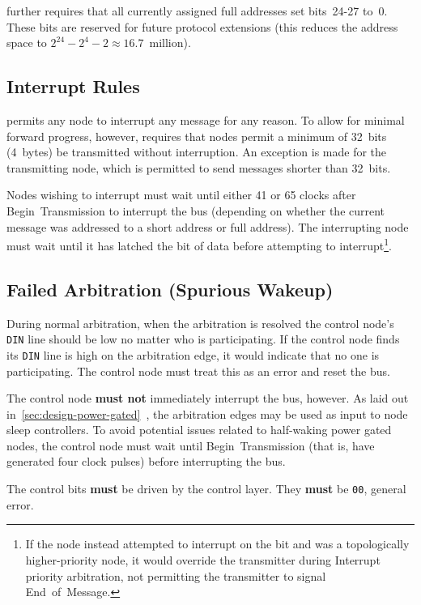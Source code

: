 \bus further requires that all currently assigned full addresses set
bits~24-27 to~0. These bits are reserved for future protocol extensions (this
reduces the address space to $2^{24} - 2^4 -2 \approx 16.7$~million).

\subsection{Interrupt Rules}
\label{sec:spec-interrupt}
\bus permits any node to interrupt any message for any reason. To allow for
minimal forward progress, however, \bus requires that nodes permit a minimum
of 32~bits (4~bytes) be transmitted without interruption. An exception is made
for the transmitting node, which is permitted to send messages shorter than
32~bits.

Nodes wishing to interrupt must wait until either 41 or 65 clocks after
Begin~Transmission to interrupt the bus (depending on whether the current
message was addressed to a short address or full address). The interrupting
node must wait until it has latched the  bit of data before attempting
to interrupt\footnote{
  If the node instead attempted to interrupt on the  bit and was a
  topologically higher-priority node, it would override the transmitter during
  Interrupt priority arbitration, not permitting the transmitter to signal
  End~of~Message.}.

\subsection{Failed Arbitration (Spurious Wakeup)}
\label{sec:spec-spurious}
During normal arbitration, when the arbitration is resolved the control node's
{\tt DIN} line should be low no matter who is participating. If the control
node finds its {\tt DIN} line is high on the arbitration edge, it would
indicate that no one is participating. The control node must treat this as an
error and reset the bus.

The control node {\bf must not} immediately interrupt the bus, however. As
laid out in~\ref{sec:design-power-gated}~, the
arbitration edges may be used as input to node sleep controllers. To avoid
potential issues related to half-waking power gated nodes, the control node
must wait until Begin~Transmission (that is, have generated four clock pulses)
before interrupting the bus.

The control bits {\bf must} be driven by the control layer. They {\bf must} be
{\tt 00}, general error.
